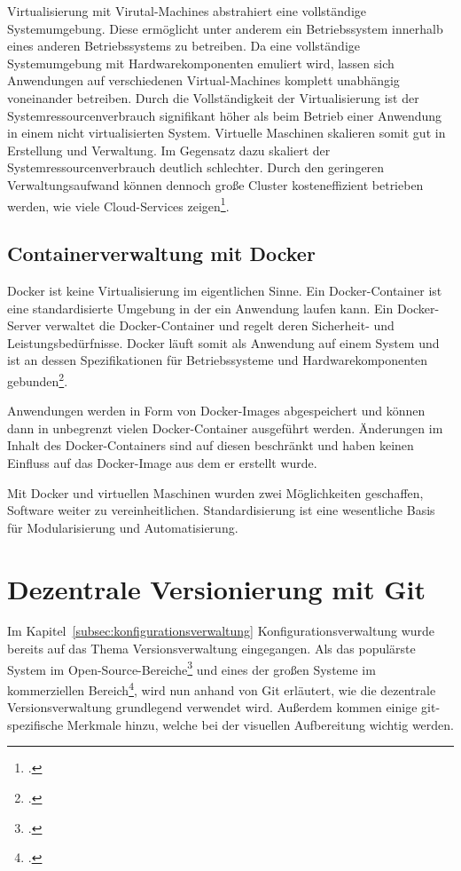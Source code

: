 Virtualisierung mit Virutal-Machines abstrahiert eine vollständige Systemumgebung. Diese ermöglicht unter anderem ein Betriebssystem innerhalb eines anderen Betriebssystems zu betreiben. Da eine vollständige Systemumgebung mit Hardwarekomponenten emuliert wird, lassen sich Anwendungen auf verschiedenen Virtual-Machines komplett unabhängig voneinander betreiben. 
Durch die Vollständigkeit der Virtualisierung ist der Systemressourcenverbrauch signifikant höher als beim Betrieb einer Anwendung in einem nicht virtualisierten System. Virtuelle Maschinen skalieren somit gut in Erstellung und Verwaltung. Im Gegensatz dazu skaliert der Systemressourcenverbrauch deutlich schlechter. Durch den geringeren Verwaltungsaufwand können dennoch große Cluster kosteneffizient betrieben werden, wie viele Cloud-Services zeigen\footcite[vgl.][]{a-cloud-guru-cost}.

\subsection{Containerverwaltung mit Docker}

Docker ist keine Virtualisierung im eigentlichen Sinne. Ein Docker-Container ist eine standardisierte Umgebung in der ein Anwendung laufen kann. Ein Docker-Server verwaltet die Docker-Container und regelt deren Sicherheit- und Leistungsbedürfnisse. Docker läuft somit als Anwendung auf einem System und ist an dessen Spezifikationen für Betriebssysteme und Hardwarekomponenten gebunden\footcite[vgl.][Kap. Why are containers important]{learn-docker}.

Anwendungen werden in Form von Docker-Images abgespeichert und können dann in unbegrenzt vielen Docker-Container ausgeführt werden. Änderungen im Inhalt des Docker-Containers sind auf diesen beschränkt und haben keinen Einfluss auf das Docker-Image aus dem er erstellt wurde.

Mit Docker und virtuellen Maschinen wurden zwei Möglichkeiten geschaffen, Software weiter zu vereinheitlichen. Standardisierung ist eine wesentliche Basis für Modularisierung und Automatisierung.

\section{Dezentrale Versionierung mit Git}

Im Kapitel~\ref{subsec:konfigurationsverwaltung} Konfigurationsverwaltung wurde bereits auf das Thema Versionsverwaltung 
eingegangen. Als das populärste System im Open-Source-Bereiche\footcite[vgl.][]{openhub-pie-chart} und eines der großen Systeme 
im kommerziellen Bereich\footcite[vgl.][]{g2crowd2018}, wird nun anhand von Git erläutert, wie die dezentrale Versionsverwaltung 
grundlegend verwendet wird. Außerdem kommen einige git-spezifische Merkmale hinzu, welche bei der visuellen Aufbereitung 
wichtig werden.

